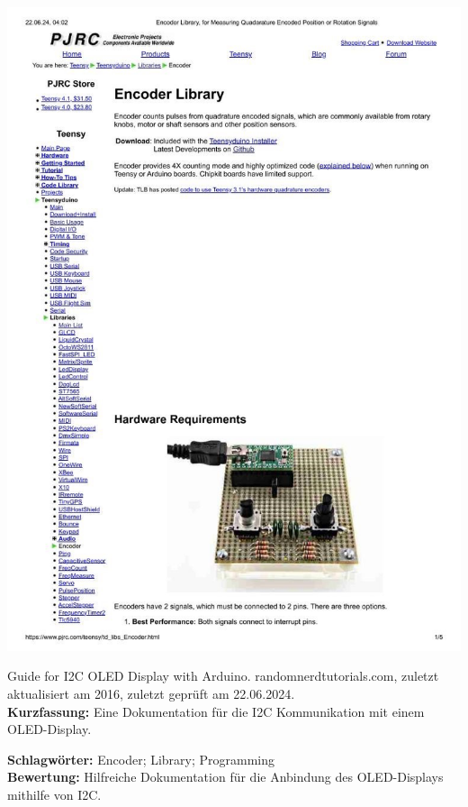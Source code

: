{
	\begin{minipage}{0.38\textwidth}
		\includegraphics[width=\linewidth]{images/Stoffregen.jpg}
	\end{minipage}
	\hfill
	\begin{minipage}{0.6\textwidth}
		Guide for I2C OLED Display with Arduino.
		randomnerdtutorials.com, zuletzt aktualisiert am 2016, zuletzt geprüft am 22.06.2024.
		\\ \textbf{Kurzfassung:}
		Eine Dokumentation für die I2C Kommunikation mit einem OLED-Display.
	\end{minipage}
	\textbf{Schlagwörter:}
	Encoder; Library; Programming
	\\ \textbf{Bewertung:}
	Hilfreiche Dokumentation für die Anbindung des OLED-Displays mithilfe von I2C.
}

